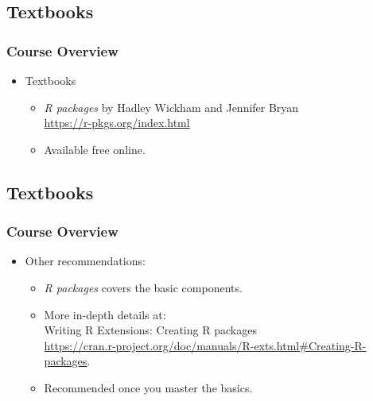\documentclass[11pt]{beamer}
\begin{document}
\subsection{Textbooks}
\begin{frame}
\frametitle{Course Overview}
\begin{itemize}
\item Textbooks
\vspace{0.2in}
\begin{itemize}
\item {\textit{R packages} by Hadley Wickham and Jennifer Bryan} \\ \url{https://r-pkgs.org/index.html}
\vspace{0.2in}
\item Available free online.
\end{itemize}
\end{itemize}
\end{frame}


\subsection{Textbooks}
\begin{frame}
\frametitle{Course Overview}
\begin{itemize}
\item Other recommendations:
\vspace{0.2in}
\begin{itemize}
\item \textit{R packages} covers the basic components. 
\vspace{0.2in}
\item More in-depth details at: \\
\vspace{0.1in}
Writing {\sf R} Extensions: Creating R packages \\
\url{https://cran.r-project.org/doc/manuals/R-exts.html#Creating-R-packages}. 
\vspace{0.2in}
\item Recommended once you master the basics. 
\end{itemize}
\end{itemize}
\end{frame}
\end{document}
